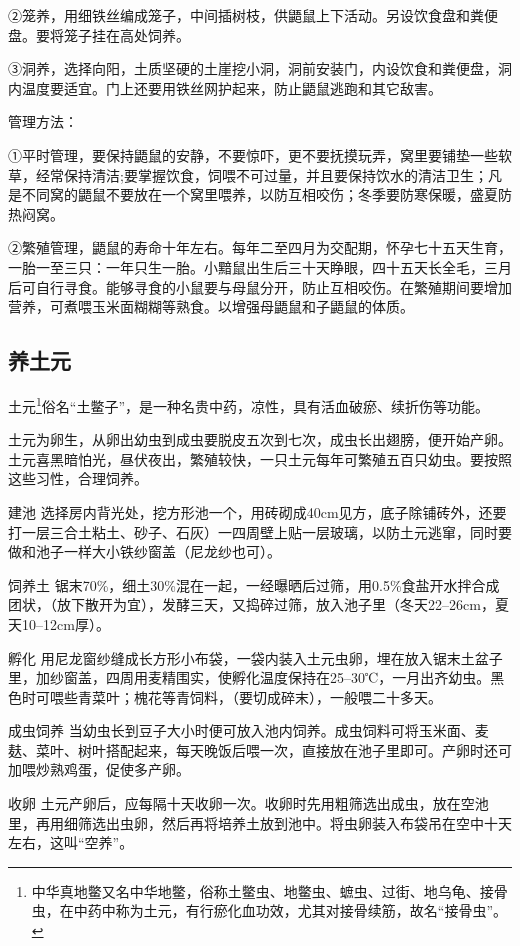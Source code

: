\documentclass{ctexbook}
\begin{document}
②笼养，用细铁丝编成笼子，中间插树枝，供鼯鼠上下活动。另设饮食盘和粪便盘。要将笼子挂在高处饲养。

③洞养，选择向阳，土质坚硬的土崖挖小洞，洞前安装门，内设饮食和粪便盘，洞内温度要适宜。门上还要用铁丝网护起来，防止鼯鼠逃跑和其它敌害。

管理方法：

①平时管理，要保持鼯鼠的安静，不要惊吓，更不要抚摸玩弄，窝里要铺垫一些软草，经常保持清洁;要掌握饮食，饲喂不可过量，并且要保持饮水的清洁卫生；凡是不同窝的鼯鼠不要放在一个窝里喂养，以防互相咬伤；冬季要防寒保暖，盛夏防热闷窝。

②繁殖管理，鼯鼠的寿命十年左右。每年二至四月为交配期，怀孕七十五天生育，一胎一至三只：一年只生一胎。小黯鼠出生后三十天睁眼，四十五天长全毛，三月后可自行寻食。能够寻食的小鼠要与母鼠分开，防止互相咬伤。在繁殖期间要增加营养，可煮喂玉米面糊糊等熟食。以增强母鼯鼠和子鼯鼠的体质。
\subsection{养土元}
土元\footnote{中华真地鳖又名中华地鳖，俗称土鳖虫、地鳖虫、蟅虫、过街、地乌龟、接骨虫，在中药中称为土元，有行瘀化血功效，尤其对接骨续筋，故名“接骨虫”。}俗名“土鳖子”，是一种名贵中药，凉性，具有活血破瘀、续折伤等功能。

土元为卵生，从卵出幼虫到成虫要脱皮五次到七次，成虫长出翅膀，便开始产卵。土元喜黑暗怕光，昼伏夜出，繁殖较快，一只土元每年可繁殖五百只幼虫。要按照这些习性，合理饲养。

建池 选择房内背光处，挖方形池一个，用砖砌成40cm见方，底子除铺砖外，还要打一层三合土粘土、砂子、石灰）一四周壁上贴一层玻璃，以防土元逃窜，同时要做和池子一样大小铁纱窗盖（尼龙纱也可）。

饲养土 锯末70\%，细土30\%混在一起，一经曝晒后过筛，用0.5\%食盐开水拌合成团状，（放下散开为宜），发酵三天，又捣碎过筛，放入池子里（冬天22--26cm，夏天10--12cm厚）。

孵化 用尼龙窗纱缝成长方形小布袋，一袋内装入土元虫卵，埋在放入锯末土盆子里，加纱窗盖，四周用麦精围实，使孵化温度保持在25--30℃，一月出齐幼虫。黑色时可喂些青菜叶；槐花等青饲料，（要切成碎末），一般喂二十多天。

成虫饲养 当幼虫长到豆子大小时便可放入池内饲养。成虫饲料可将玉米面、麦麸、菜叶、树叶搭配起来，每天晚饭后喂一次，直接放在池子里即可。产卵时还可加喂炒熟鸡蛋，促使多产卵。

收卵 土元产卵后，应每隔十天收卵一次。收卵时先用粗筛选出成虫，放在空池里，再用细筛选出虫卵，然后再将培养土放到池中。将虫卵装入布袋吊在空中十天左右，这叫“空养”。
\end{document}
